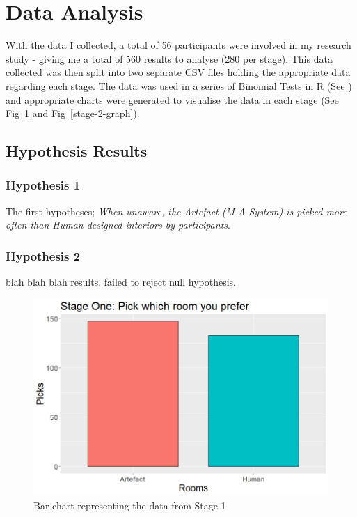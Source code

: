 \section{Data Analysis}
With the data I collected, a total of 56 participants were involved in my research study - giving me a total of 560 results to analyse (280 per stage). This data collected was then split into two separate CSV files holding the appropriate data regarding each stage. The data was used in a series of Binomial Tests in R (See \hyperref[append:g]{}) and appropriate charts were generated to visualise the data in each stage (See Fig~\ref{stage-1-graph} and Fig~\ref{stage-2-graph}).

\subsection{Hypothesis Results}
\subsubsection{Hypothesis 1}
The first hypotheses;
\textit{When unaware, the Artefact (M-A System) is picked more often than Human designed interiors by participants}.

\subsubsection{Hypothesis 2}
blah blah blah results. failed to reject null hypothesis.

\begin{figure}[!ht]
    \includegraphics[width=\columnwidth]{./Images/stage-1-picks-graph.png}
    \centering
    \caption{Bar chart representing the data from Stage 1}
    \label{stage-1-graph}
\end{figure}

